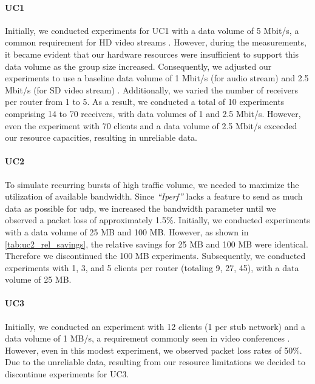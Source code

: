 \paragraph{UC1} %
\label{par:UC1}
Initially, we conducted experiments for UC1 with a data volume of 5 Mbit/s,
    a common requirement for HD video streams \cite{cartesian_us_bw}.
However, during the measurements, it became evident that our hardware resources
    were insufficient to support this data volume as the group size increased.
Consequently, we adjusted our experiments to use a baseline data volume of 1
    Mbit/s (for audio stream) and 2.5 Mbit/s (for SD video stream)
    \cite{cartesian_us_bw}.
Additionally, we varied the number of receivers per router from 1 to 5.
As a result, we conducted a  total of 10 experiments comprising 14 to 70
    receivers, with data volumes of 1 and 2.5 Mbit/s.
However, even the experiment with 70 clients and a data volume of 2.5 Mbit/s 
    exceeded our resource capacities, resulting in unreliable data.

\paragraph{UC2} %
\label{par:UC2}
To simulate recurring bursts of high traffic volume, we needed to maximize the
    utilization of available bandwidth.
Since \textit{``Iperf''} lacks a feature to send as much data as possible for
    \gls{udp}, we increased the bandwidth parameter until we observed a packet
    loss of approximately 1.5\%.
Initially, we conducted experiments with a data volume of 25 MB and 100 MB.
However, as shown in \autoref{tab:uc2_rel_savings}, the relative savings for 
    25 MB and 100 MB were identical.
Therefore we discontinued the 100 MB experiments.
Subsequently, we conducted experiments with 1, 3, and 5 clients per router
    (totaling 9, 27, 45), with a data volume of 25 MB.

\paragraph{UC3} %
\label{par:UC3}
Initially, we conducted an experiment with 12 clients (1 per stub network) and
    a data volume of 1 MB/s, a requirement commonly seen in video conferences
    \cite{cartesian_us_bw}.
However, even in this modest experiment, we observed packet loss rates of
    50\%.
Due to the unreliable data, resulting from our resource limitations we decided
    to discontinue experiments for UC3.

